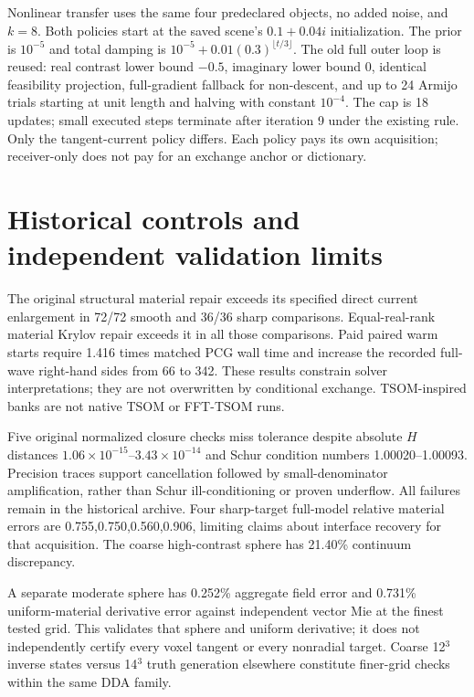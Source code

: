 \documentclass[11pt]{article}
\begin{document}
Nonlinear transfer uses the same four predeclared objects, no added noise, and $k=8$. Both policies start at the saved scene's $0.1+0.04i$ initialization. The prior is $10^{-5}$ and total damping is $10^{-5}+0.01(0.3)^{\lfloor t/3\rfloor}$. The old full outer loop is reused: real contrast lower bound $-0.5$, imaginary lower bound 0, identical feasibility projection, full-gradient fallback for non-descent, and up to 24 Armijo trials starting at unit length and halving with constant $10^{-4}$. The cap is 18 updates; small executed steps terminate after iteration 9 under the existing rule. Only the tangent-current policy differs. Each policy pays its own acquisition; receiver-only does not pay for an exchange anchor or dictionary.



\section{Historical controls and independent validation limits}
The original structural material repair exceeds its specified direct current enlargement in 72/72 smooth and 36/36 sharp comparisons. Equal-real-rank material Krylov repair exceeds it in all those comparisons. Paid paired warm starts require 1.416 times matched PCG wall time and increase the recorded full-wave right-hand sides from 66 to 342. These results constrain solver interpretations; they are not overwritten by conditional exchange. TSOM-inspired banks are not native TSOM or FFT-TSOM runs.

Five original normalized closure checks miss tolerance despite absolute $H$ distances $1.06\times10^{-15}$--$3.43\times10^{-14}$ and Schur condition numbers 1.00020--1.00093. Precision traces support cancellation followed by small-denominator amplification, rather than Schur ill-conditioning or proven underflow. All failures remain in the historical archive. Four sharp-target full-model relative material errors are 0.755,0.750,0.560,0.906, limiting claims about interface recovery for that acquisition. The coarse high-contrast sphere has 21.40\% continuum discrepancy.

A separate moderate sphere has 0.252\% aggregate field error and 0.731\% uniform-material derivative error against independent vector Mie at the finest tested grid. This validates that sphere and uniform derivative; it does not independently certify every voxel tangent or every nonradial target. Coarse 12$^3$ inverse states versus 14$^3$ truth generation elsewhere constitute finer-grid checks within the same DDA family.
\end{document}
